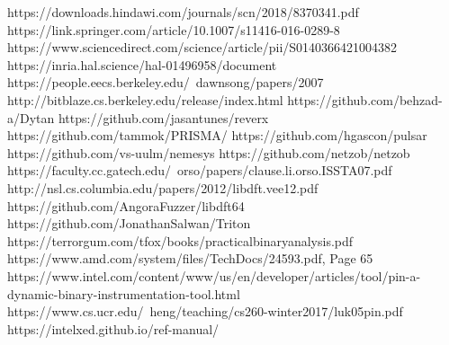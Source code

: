 \documentclass[conference]{IEEEtran}
\begin{document}
\begin{thebibliography}{00}
     https://downloads.hindawi.com/journals/scn/2018/8370341.pdf
     https://link.springer.com/article/10.1007/s11416-016-0289-8
     https://www.sciencedirect.com/science/article/pii/S0140366421004382
     https://inria.hal.science/hal-01496958/document
     https://people.eecs.berkeley.edu/~dawnsong/papers/2007%
     http://bitblaze.cs.berkeley.edu/release/index.html
     https://github.com/behzad-a/Dytan
     https://github.com/jasantunes/reverx
     https://github.com/tammok/PRISMA/
     https://github.com/hgascon/pulsar
     https://github.com/vs-uulm/nemesys
     https://github.com/netzob/netzob
     https://faculty.cc.gatech.edu/~orso/papers/clause.li.orso.ISSTA07.pdf
     http://nsl.cs.columbia.edu/papers/2012/libdft.vee12.pdf
     https://github.com/AngoraFuzzer/libdft64
     https://github.com/JonathanSalwan/Triton
     https://terrorgum.com/tfox/books/practicalbinaryanalysis.pdf
     https://www.amd.com/system/files/TechDocs/24593.pdf, Page 65
     https://www.intel.com/content/www/us/en/developer/articles/tool/pin-a-dynamic-binary-instrumentation-tool.html
     https://www.cs.ucr.edu/~heng/teaching/cs260-winter2017/luk05pin.pdf
     https://intelxed.github.io/ref-manual/

\end{thebibliography}
\vspace{12pt}
\end{document}
